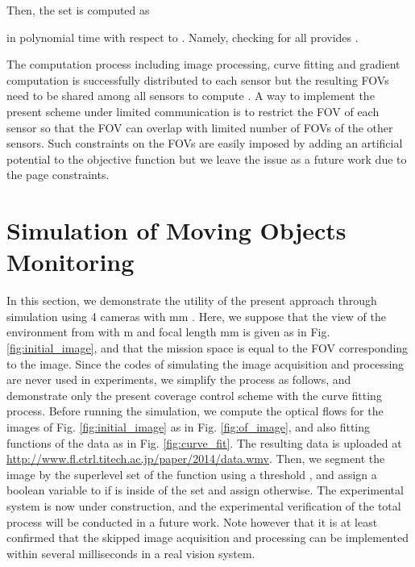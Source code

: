 \documentclass[conference,letterpaper]{ieeeconf}
\begin{document}
Then, the set  is computed as

in polynomial time with respect to .
Namely, checking 
for all 
provides  .













The computation process including image processing, 
curve fitting and gradient computation
is successfully distributed to each sensor but the resulting FOVs need to be shared
among all sensors to compute .
A way to implement the present scheme under 
limited communication
is to restrict the FOV of each sensor so that the FOV can overlap
with limited number of FOVs of the other sensors.
Such constraints on the FOVs are easily imposed by adding
an artificial potential to the objective function but 
 we leave the issue as a future work due to the page constraints.










\section{Simulation of Moving Objects Monitoring}



In this section, we demonstrate the utility of the
present approach through simulation using 4 cameras with mm .
Here, we suppose that the view of the environment from  with m and focal length 
mm is given as in 
Fig. \ref{fig:initial_image},
and that the mission space  is equal to the FOV corresponding to the image.
Since the codes of simulating the image acquisition and processing are never used in experiments,
we simplify the process as follows, and demonstrate only the present coverage control scheme 
with the curve fitting process.
Before running the simulation, we compute the optical flows
for the images of Fig. \ref{fig:initial_image} as in Fig. \ref{fig:of_image},
and also fitting functions of the data as in Fig. \ref{fig:curve_fit}.
The resulting data is uploaded at
\url{http://www.fl.ctrl.titech.ac.jp/paper/2014/data.wmv}.
Then, we segment the image by the superlevel set
of the function using a threshold ,
and assign a boolean variable  to  if 
 is inside of the set and assign  otherwise.
The experimental system is now under construction, and the
experimental verification of the total process
will be conducted in a future work.
Note however that it is at least confirmed that 
the skipped image acquisition and processing 
can be implemented within several milliseconds in a real vision system.
\end{document}
